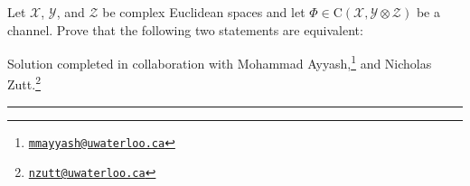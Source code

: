 \documentclass[boxes,pages,color=SeaGreen]{homework}
\newcommand{\collab}[1]{\footnote{\href{mailto:#1}{\texttt{#1}}}}
\newcommand{\I}{\mathbb{1}}
\newcommand{\X}{\mathcal{X}}
\newcommand{\Y}{\mathcal{Y}}
\newcommand{\Z}{\mathcal{Z}}
\newcommand{\W}{\mathcal{W}}
\newcommand{\Lin}{\mathrm{L}}
\newcommand{\Channel}{\mathrm{C}}
\newcommand{\Density}{\mathrm{D}}
\begin{document}

\begin{problem}
Let $\X$, $\Y$, and $\Z$ be complex Euclidean spaces and let
$\Phi\in\Channel(\X,\Y\otimes\Z)$ be a channel.
Prove that the following two statements are equivalent:
\vspace{-25pt}
\end{problem}
\noindent Solution completed in collaboration with Mohammad Ayyash,\collab{mmayyash@uwaterloo.ca} and Nicholas Zutt.\collab{nzutt@uwaterloo.ca}

{\noindent\color{SeaGreen!30}\rule{\textwidth}{1.5pt}}
\end{document}
